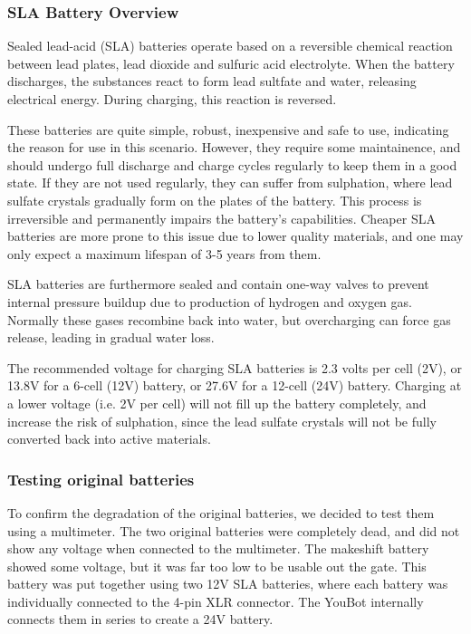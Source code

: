 \documentclass[a4paper, 12pt]{article}
\begin{document}
    \subsubsection{SLA Battery Overview}

    Sealed lead-acid (SLA) batteries operate based on a reversible chemical reaction between lead plates, lead dioxide and sulfuric acid electrolyte. When the battery discharges, the substances react to form lead sultfate and water, releasing electrical energy. During charging, this reaction is reversed.

    These batteries are quite simple, robust, inexpensive and safe to use, indicating the reason for use in this scenario. However, they require some maintainence, and should undergo full discharge and charge cycles regularly to keep them in a good state. If they are not used regularly, they can suffer from sulphation, where lead sulfate crystals gradually form on the plates of the battery. This process is irreversible and permanently impairs the battery's capabilities. Cheaper SLA batteries are more prone to this issue due to lower quality materials, and one may only expect a maximum lifespan of 3-5 years from them. 

    SLA batteries are furthermore sealed and contain one-way valves to prevent internal pressure buildup due to production of hydrogen and oxygen gas. Normally these gases recombine back into water, but overcharging can force gas release, leading in gradual water loss. 

    The recommended voltage for charging SLA batteries is 2.3 volts per cell (2V), or 13.8V for a 6-cell (12V) battery, or 27.6V for a 12-cell (24V) battery. Charging at a lower voltage (i.e. 2V per cell) will not fill up the battery completely, and increase the risk of sulphation, since the lead sulfate crystals will not be fully converted back into active materials. 

    \subsubsection{Testing original batteries}

    To confirm the degradation of the original batteries, we decided to test them using a multimeter. The two original batteries were completely dead, and did not show any voltage when connected to the multimeter. The makeshift battery showed some voltage, but it was far too low to be usable out the gate. This battery was put together using two 12V SLA batteries, where each battery was individually connected to the 4-pin XLR connector. The YouBot internally connects them in series to create a 24V battery.   
    
\end{document}
